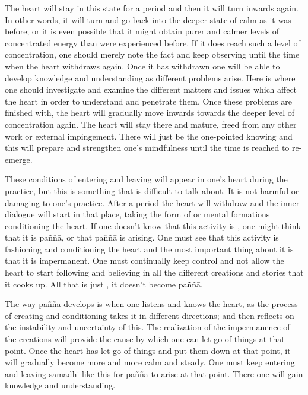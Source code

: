 The heart will stay in this state for a period and then it will turn inwards again. In other words, it will turn and go back into the deeper state of calm as it was before; or it is even possible that it might obtain purer and calmer levels of concentrated energy than were experienced before. If it does reach such a level of concentration, one should merely note the fact and keep observing until the time when the heart withdraws again. Once it has withdrawn one will be able to develop knowledge and understanding as different problems arise. Here is where one should investigate and examine the different matters and issues which affect the heart in order to understand and penetrate them. Once these problems are finished with, the heart will gradually move inwards towards the deeper level of concentration again. The heart will stay there and mature, freed from any other work or external impingement. There will just be the one-pointed knowing and this will prepare and strengthen one's mindfulness  until the time is reached to re-emerge.

These conditions of entering and leaving will appear in one's heart during the practice, but this is something that is difficult to talk about. It is not harmful or damaging to one's practice. After a period the heart will withdraw and the inner dialogue will start in that place, taking the form of  or mental formations conditioning the heart. If one doesn't know that this activity is , one might think that it is pa\~n\~n\=a, or that pa\~n\~n\=a is arising. One must see that this activity is fashioning and conditioning the heart and the most important thing about it is that it is impermanent. One must continually keep control and not allow the heart to start following and believing in all the different creations and stories that it cooks up. All that is just , it doesn't become pa\~n\~n\=a.

The way pa\~n\~n\=a develops is when one listens and knows the heart, as the process of creating and conditioning takes it in different directions; and then reflects on the instability and uncertainty of this. The realization of the impermanence of the creations will provide the cause by which one can let go of things at that point. Once the heart has let go of things and put them down at that point, it will gradually become more and more calm and steady. One must keep entering and leaving sam\=adhi like this for pa\~n\~n\=a to arise at that point. There one will gain knowledge and understanding. 


